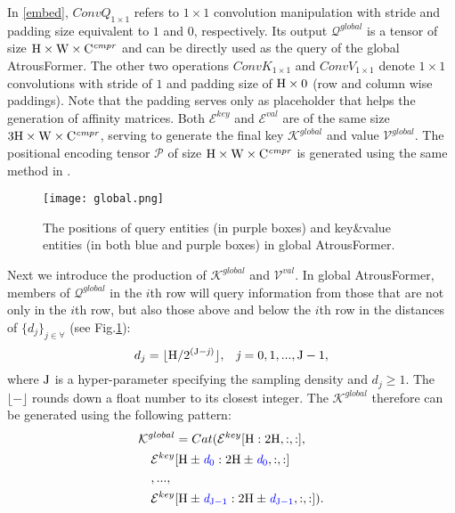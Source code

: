 \documentclass[preprint,12pt,review]{elsarticle}
\begin{document}
In \eqref{embed}, $ConvQ_{1\times 1}$ refers to $1 \times 1$ convolution manipulation with stride and padding size equivalent to $1$ and $0$, respectively. Its output $\mathcal{Q}^{global}$ is a tensor of size $\rm{H} \times \rm{W} \times \rm{C}^{\it{cmpr}}$ and can be directly used as the query of the global AtrousFormer. The other two operations $ConvK_{1\times 1}$ and $ConvV_{1\times 1}$ denote $1 \times 1$ convolutions with stride of $1$ and padding size of $\rm{H} \times 0$ (row and column wise paddings). Note that the padding serves only as placeholder that helps the generation of affinity matrices. Both $\mathcal{E}^{key}$ and $\mathcal{E}^{val}$ are of the same size $3\rm{H} \times \rm{W} \times \rm{C}^{\it{cmpr}}$, serving to generate the final key $\mathcal{K}^{global}$ and value $\mathcal{V}^{global}$. The positional encoding tensor $\mathcal{P}$ of size $\rm{H} \times \rm{W} \times \rm{C}^{\it{cmpr}}$ is generated using the same method in \cite{transformer}. 

\begin{figure}[tbp]
	\centering
	\texttt{[image: global.png]}
	\caption{The positions of query entities (in purple boxes) and key\&value entities (in both blue and purple boxes) in global AtrousFormer.}
	\label{fig:att}
\end{figure}


Next we introduce the production of $\mathcal{K}^{global}$ and $\mathcal{V}^{val}$. In global AtrousFormer, members of $\mathcal{Q}^{global}$ in the $i$th row will query information from those that are not only in the $i$th row, but also those above and below the $i$th row in the distances of $\{d_j\}_{j\in \forall}$ (see Fig.\ref{fig:att}):
\begin{equation} \label{heu:exp}
	d_{j} = \lfloor \rm{H}/{2^{(\rm{J}- \it{j})}} \rfloor \rm{,} \hspace{10pt} \it{j} = \rm{0,1,..., \rm{J-1}},
\end{equation}
where $\rm{J}$ is a hyper-parameter specifying the sampling density and $d_{j}\geq 1$. The $\lfloor - \rfloor$ rounds down a float number to its closest integer. The $\mathcal{K}^{global}$ therefore can be generated using the following pattern:
\begin{align}\label{key:gen}
	&\mathcal{K}^{global} = Cat(\mathcal{E}^{key}[\rm{H}: 2\rm{H}, :, :],\nonumber \\
	&\quad \mathcal{E}^{key}[\rm{H}\pm \textcolor{blue}{\it{d}_{\rm 0}}: 2\rm{H}\pm \textcolor{blue}{\it{d}_{\rm 0}}, :, :]\nonumber \\
	&\quad ,..., \nonumber \\
	&\quad \mathcal{E}^{key}[\rm{H}\pm \textcolor{blue}{\it{d}_{\rm J-1}}: 2\rm{H}\pm \textcolor{blue}{\it{d}_{\rm J-1}}, :, :]).
\end{align}
\end{document}
